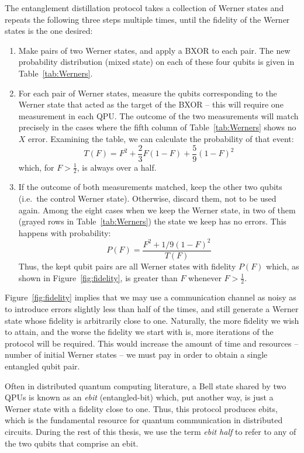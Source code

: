 The entanglement distillation protocol takes a collection of Werner states and repeats the following three steps multiple times, until the fidelity of the Werner states is the one desired:

\begin{enumerate}
  \item Make pairs of two Werner states, and apply a BXOR to each pair. The new probability distribution (mixed state) on each of these four qubits is given in Table~\ref{tab:Werners}.

  \item For each pair of Werner states, measure the qubits corresponding to the Werner state that acted as the target of the BXOR -- this will require one measurement in each QPU. The outcome of the two measurements will match precisely in the cases where the fifth column of Table~\ref{tab:Werners} shows no \(X\) error. Examining the table, we can calculate the probability of that event: {\small \[T(F) = F^2 + \frac{2}{3} F(1-F) + \frac{5}{9} (1-F)^2\]}which, for \(F > \frac{1}{2}\), is always over a half.

  \item If the outcome of both measurements matched, keep the other two qubits (i.e.\ the control Werner state). Otherwise, discard them, not to be used again. Among the eight cases when we keep the Werner state, in two of them (grayed rows in Table~\ref{tab:Werners}) the state we keep has no errors. This happens with probability: {\small \[P(F) = \frac{F^2 + 1/9(1-F)^2}{T(F)}\]}Thus, the kept qubit pairs are all Werner states with fidelity \(P(F)\) which, as shown in Figure~\ref{fig:fidelity}, is greater than \(F\) whenever \(F > \frac{1}{2}\).
\end{enumerate}





Figure~\ref{fig:fidelity} implies that we may use a communication channel as noisy as to introduce errors slightly less than half of the times, and still generate a Werner state whose fidelity is arbitrarily close to one. Naturally, the more fidelity we wish to attain, and the worse the fidelity we start with is, more iterations of the protocol will be required. This would increase the amount of time and resources -- number of initial Werner states -- we must pay in order to obtain a single entangled qubit pair.

Often in distributed quantum computing literature, a Bell state shared by two QPUs is known as an \textit{ebit} (entangled-bit) which, put another way, is just a Werner state with a fidelity close to one. Thus, this protocol produces ebits, which is the fundamental resource for quantum communication in distributed circuits. During the rest of this thesis, we use the term \textit{ebit half} to refer to any of the two qubits that comprise an ebit.

